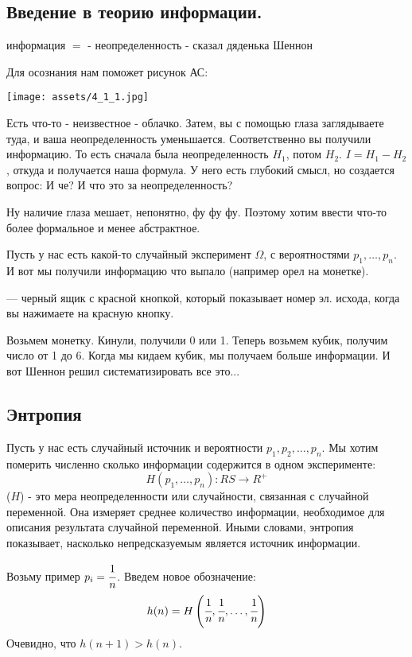 \subsection{Введение в теорию информации.}

информация $=$ - неопределенность - сказал дяденька Шеннон

Для осознания нам поможет рисунок АС:
\begin{center}
    \texttt{[image: assets/4\_1\_1.jpg]}
\end{center}
Есть что-то - неизвестное - облачко. Затем, вы с помощью глаза заглядываете туда, и ваша неопределенность уменьшается. Соответственно вы получили информацию. То есть сначала была неопределенность $H_1$, потом $H_2$.  $I = H_1-H_2$, откуда и получается наша формула. У него есть глубокий смысл, но создается вопрос: \flqq И че? И что это за неопределенность?\frqq

Ну наличие глаза мешает, непонятно, фу фу фу. Поэтому хотим ввести что-то более формальное и менее абстрактное.

Пусть у нас есть какой-то случайный эксперимент $\Omega$, с вероятностями $p_1,\ldots, p_n$. И вот мы получили информацию что выпало (например орел на монетке).

 --- черный ящик с красной кнопкой, который показывает номер эл. исхода, когда вы нажимаете на красную кнопку.

Возьмем монетку. Кинули, получили 0 или 1. Теперь возьмем кубик, получим число от 1 до 6. Когда мы кидаем кубик, мы получаем больше информации. И вот Шеннон решил систематизировать все это...

\subsection{Энтропия}

Пусть у нас есть случайный источник и вероятности $p_1,p_2,\ldots ,p_n$. Мы хотим померить численно сколько информации содержится в одном эксперименте:
$$H(p_1,\ldots,p_n):RS\rightarrow R^+$$ 
($H$) - это мера неопределенности или случайности, связанная с случайной переменной. Она измеряет среднее количество информации, необходимое для описания результата случайной переменной. Иными словами, энтропия показывает, насколько непредсказуемым является источник информации.

Возьму пример $p_i = \cfrac{1}{n}$. Введем новое обозначение:
$$h(n) = H\left(\cfrac{1}{n},\cfrac{1}{n},\ldots,\cfrac{1}{n}\right)$$
Очевидно, что $h(n+1)>h(n)$.


